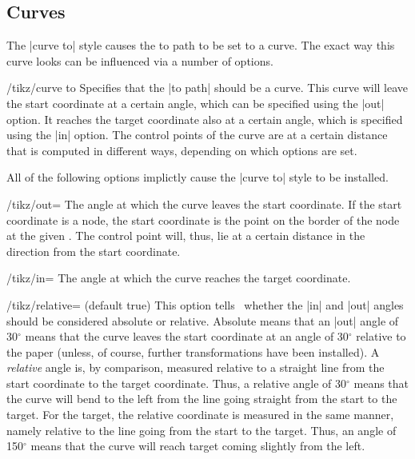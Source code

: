 \subsection{Curves}

The |curve to| style causes the to path to be set to a curve. The
exact way this curve looks can be influenced via a number of options.

\begin{key}{/tikz/curve to}
  Specifies that the |to path| should be a curve. This curve will
  leave the start coordinate at a certain angle, which can be
  specified using the |out| option. It reaches the target coordinate
  also at a certain angle, which is specified using the |in|
  option. The control points of the curve are at a certain distance
  that is computed in different ways, depending on which options are
  set.

  All of the following options implictly cause the |curve to| style to
  be installed.

  \begin{key}{/tikz/out=}
    The angle at which the curve leaves the start coordinate. If the
    start coordinate is a node, the start coordinate is the point on the
    border of the node at the given . The control point
    will, thus, lie at a certain distance in the direction 
    from the start coordinate.
\begin{codeexample}[]
\end{codeexample}
  \end{key}
  \begin{key}{/tikz/in=}
    The angle at which the curve reaches the target coordinate.
  \end{key}

  \begin{key}{/tikz/relative= (default true)}
    This option tells \tikzname\ whether the |in| and |out| angles
    should be considered absolute or relative. Absolute means that an
    |out| angle of 30$^\circ$ means that the curve leaves the start
    coordinate at an angle of 30$^\circ$ relative to the paper (unless,
    of course, further transformations have been installed). A
    \emph{relative} angle is, by comparison, measured relative to a
    straight line from the start coordinate to the target
    coordinate. Thus, a relative angle of 30$^\circ$ means that the
    curve will bend to the left from the line going straight from the
    start to the target. For the target, the relative coordinate is
    measured in the same manner, namely relative to the line going from
    the start to the target. Thus, an angle of 150$^\circ$ means that
    the curve will reach target coming slightly from the left.


\end{key}
\end{key}
